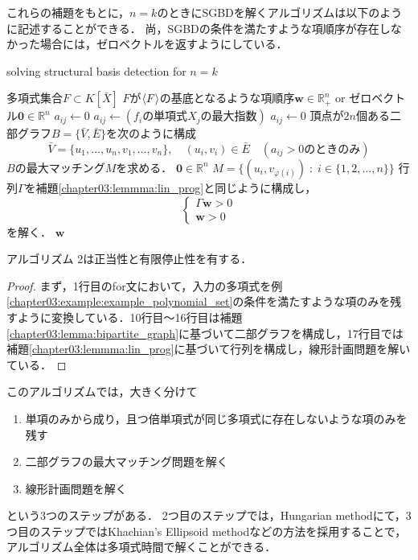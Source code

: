 これらの補題をもとに，$n=k$のときにSGBDを解くアルゴリズムは以下のように記述することができる．
尚，SGBDの条件を満たすような項順序が存在しなかった場合には，ゼロベクトルを返すようにしている．
\begin{algorithm}[htbp]
	\label{chapter03:algorithm:SGBD}
	\caption{solving structural \groebner{} basis detection for $n = k$ {\cite[Algorighm7]{sturmfels1997structural}}}
	\begin{algorithmic}[1]
		\Require 多項式集合$F \subset K[\bar{X}]$
		\Ensure $F$が$\langle F \rangle$の\groebner{}基底となるような項順序$\bm{w} \in \mathbb{R}_{+}^n$ or ゼロベクトル$\bm{0} \in \mathbb{R}^n$
				\State $a_{ij} \gets 0$
			\EndIf
			\State $a_{ij} \gets (f_i\text{の単項式}X_j\text{の最大指数})$
				\State $a_{ij} \gets 0$
			\EndIf
		\EndFor
		\State 頂点が$2n$個ある二部グラフ$B = \{\bar{V}, \bar{E}\}$を次のように構成
		$$\bar{V} = \{u_1, \dots, u_n, v_1, \dots, v_n\}, \quad (u_i, v_i) \in \bar{E} \quad(a_{ij} > 0 \text{のときのみ})$$
		\State $B$の最大マッチング$M$を求める．
			\State \Return $\bm{0} \in \mathbb{R}^n$
		\Else 
			\State $M = \{(u_i, v_{\varphi(i)})\;:\; i \in \{1, 2, \dots, n\}\}$
		\EndIf
		\State 行列$\varGamma$を補題\ref{chapter03:lemmma:lin_prog}と同じように構成し，
		$$\begin{cases}
			\varGamma \bm{w} > 0\\
			\bm{w} > 0
		\end{cases}$$
		を解く．
		\State \Return $\bm{w}$
	\end{algorithmic}
\end{algorithm}

\begin{theorem}
	アルゴリズム 2は正当性と有限停止性を有する．
\end{theorem}
\begin{proof}
	まず，1行目のfor文において，入力の多項式を例\ref{chapter03:example:example_polynomial_set}の条件を満たすような項のみを残すように変換している．10行目〜16行目は補題\ref{chapter03:lemma:bipartite_graph}に基づいて二部グラフを構成し，17行目では補題\ref{chapter03:lemmma:lin_prog}に基づいて行列を構成し，線形計画問題を解いている．
\end{proof}
このアルゴリズムでは，大きく分けて
\begin{enumerate}
	\item 単項のみから成り，且つ倍単項式が同じ多項式に存在しないような項のみを残す
	\item 二部グラフの最大マッチング問題を解く
	\item 線形計画問題を解く
\end{enumerate}
という$3$つのステップがある．
2つ目のステップでは，Hungarian method\cite{plummer1986matching}にて，3つ目のステップではKhachian's Ellipsoid method\cite{schrijver1998theory}などの方法を採用することで，アルゴリズム全体は多項式時間で解くことができる\cite{sturmfels1997structural}．

